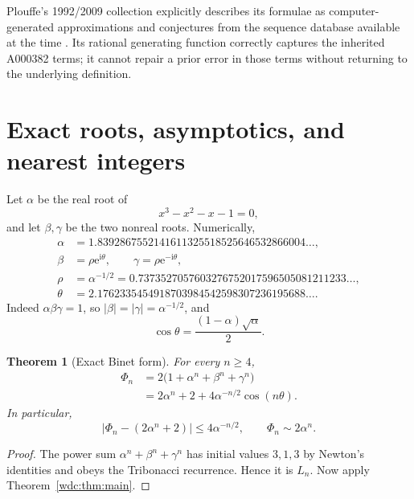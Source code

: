 \documentclass[11pt,letterpaper]{article}
\numberwithin{equation}{section}
\newtheorem{theorem}{Theorem}[section]
\theoremstyle{definition}
\newcommand{\e}{\mathrm e}
\newcommand{\ii}{\mathrm i}
\newcommand{\abs}[1]{\lvert#1\rvert}
\begin{document}
Plouffe's 1992/2009 collection explicitly describes its formulae as
computer-generated approximations and conjectures from the sequence database
available at the time \cite{plouffe2009}.  Its rational generating function
correctly captures the inherited A000382 terms; it cannot repair a prior error
in those terms without returning to the underlying definition.

\section{Exact roots, asymptotics, and nearest integers}\label{wdc:sec:asymptotics}

Let $\alpha$ be the real root of
\begin{equation}\label{wdc:eq:trib-polynomial}
  x^3-x^2-x-1=0,
\end{equation}
and let $\beta,\gamma$ be the two nonreal roots.  Numerically,
\begin{align}
 \alpha&=1.8392867552141611325518525646532866004\dots,\label{wdc:eq:alpha-num}\\
 \beta&=\rho\e^{\ii\theta},\qquad
 \gamma=\rho\e^{-\ii\theta},\nonumber\\
 \rho&=\alpha^{-1/2}
      =0.7373527057603276752017596505081211233\dots,\label{wdc:eq:rho-num}\\
 \theta&=2.1762335454918703984542598307236195688\dots.\label{wdc:eq:theta-num}
\end{align}
Indeed $\alpha\beta\gamma=1$, so $\abs\beta=\abs\gamma=\alpha^{-1/2}$, and
\begin{equation}\label{wdc:eq:theta-exact}
  \cos\theta=\frac{(1-\alpha)\sqrt\alpha}{2}.
\end{equation}

\begin{theorem}[Exact Binet form]\label{wdc:thm:Binet}
For every $n\ge4$,
\begin{align}
  \Phi_n
  &=2\bigl(1+\alpha^n+\beta^n+\gamma^n\bigr)\label{wdc:eq:Binet-complex}\\
  &=2\alpha^n+2+4\alpha^{-n/2}\cos(n\theta).\label{wdc:eq:Binet-real}
\end{align}
In particular,
\begin{equation}\label{wdc:eq:sharp-error}
  \abs{\Phi_n-(2\alpha^n+2)}\le4\alpha^{-n/2},
  \qquad
  \Phi_n\sim2\alpha^n.
\end{equation}
\end{theorem}

\begin{proof}
The power sum $\alpha^n+\beta^n+\gamma^n$ has initial values $3,1,3$ by
Newton's identities and obeys the Tribonacci recurrence.  Hence it is $L_n$.
Now apply Theorem~\ref{wdc:thm:main}.
\end{proof}
\end{document}
